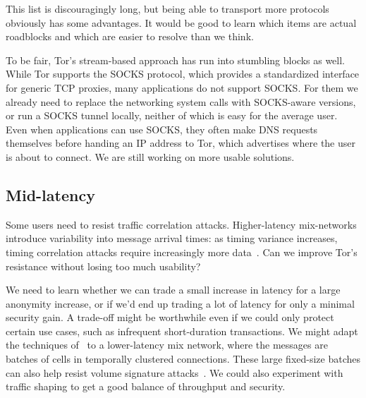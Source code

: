 \documentclass{llncs}
\begin{document}
This list is discouragingly long, but being able to transport more
protocols obviously has some advantages. It would be good to learn which
items are actual roadblocks and which are easier to resolve than we think.

To be fair, Tor's stream-based approach has run into
stumbling blocks as well. While Tor supports the SOCKS protocol,
which provides a standardized interface for generic TCP proxies, many
applications do not support SOCKS\@. For them we already need to
replace the networking system calls with SOCKS-aware
versions, or run a SOCKS tunnel locally, neither of which is
easy for the average user. %
Even when applications can use SOCKS, they often make DNS requests
themselves before handing an IP address to Tor, which advertises
where the user is about to connect.
We are still working on more usable solutions.


\subsection{Mid-latency}
\label{subsec:mid-latency}

Some users need to resist traffic correlation attacks.  Higher-latency
mix-networks introduce variability into message
arrival times: as timing variance increases, timing correlation attacks
require increasingly more data~\cite{e2e-traffic}. Can we improve Tor's
resistance without losing too much usability?

We need to learn whether we can trade a small increase in latency
for a large anonymity increase, or if we'd end up trading a lot of
latency for only a minimal security gain. A trade-off might be worthwhile
even if we
could only protect certain use cases, such as infrequent short-duration
transactions. %
We might adapt the techniques of~\cite{e2e-traffic} to a lower-latency mix
network, where the messages are batches of cells in temporally clustered
connections. These large fixed-size batches can also help resist volume
signature attacks~\cite{hintz-pet02}. We could also experiment with traffic
shaping to get a good balance of throughput and security.
\end{document}
